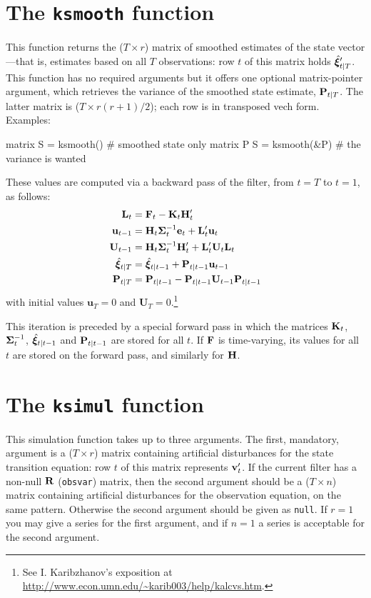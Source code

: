 \section{The \texttt{ksmooth} function}

This function returns the ($T \times r$) matrix of smoothed estimates
of the state vector---that is, estimates based on all $T$
observations: row $t$ of this matrix holds $\hat{\bm{\xi}}_{t|T}'$.  This
function has no required arguments but it offers one optional
matrix-pointer argument, which retrieves the variance of the smoothed
state estimate, $\mathbf{P}_{t|T}$.  The latter matrix is ($T \times
r(r+1)/2$); each row is in transposed vech form.  Examples:
%
\begin{code}
matrix S = ksmooth()  # smoothed state only
matrix P
S = ksmooth(&P)       # the variance is wanted
\end{code}

These values are computed via a backward pass of the filter, from
$t = T$ to $t = 1$, as follows:
%
\begin{align*}
\mathbf{L}_t &= \mathbf{F}_t - \mathbf{K}_t \mathbf{H}_t' \\
\mathbf{u}_{t-1} &= \mathbf{H}_t \bm{\Sigma}_t^{-1} \mathbf{e}_t 
 + \mathbf{L}_t' \mathbf{u}_t \\
\mathbf{U}_{t-1} &= \mathbf{H}_t \bm{\Sigma}_t^{-1} \mathbf{H}_t' + 
  \mathbf{L}_t' \mathbf{U}_t \mathbf{L}_t \\
\hat{\bm{\xi}}_{t|T} &= \hat{\bm{\xi}}_{t|t-1} + 
  \mathbf{P}_{t|t-1} \mathbf{u}_{t-1} \\
\mathbf{P}_{t|T} &= \mathbf{P}_{t|t-1} - 
  \mathbf{P}_{t|t-1} \mathbf{U}_{t-1} \mathbf{P}_{t|t-1}
\end{align*}
%
with initial values $\mathbf{u}_T = 0$ and $\mathbf{U}_T =
0$.\footnote{See I. Karibzhanov's exposition at
\url{http://www.econ.umn.edu/~karib003/help/kalcvs.htm}.}

This iteration is preceded by a special forward pass in which the
matrices $\mathbf{K}_t$, $\bm{\Sigma}_t^{-1}$, $\hat{\bm{\xi}}_{t|t-1}$ and
$\mathbf{P}_{t|t-1}$ are stored for all $t$.  If $\mathbf{F}$
is time-varying, its values for all $t$ are stored on the forward
pass, and similarly for $\mathbf{H}$.


\section{The \texttt{ksimul} function}

This simulation function takes up to three arguments.  The first,
mandatory, argument is a ($T \times r$) matrix containing artificial
disturbances for the state transition equation: row $t$ of this matrix
represents $\mathbf{v}_t'$.  If the current filter has a non-null
$\mathbf{R}$ (\texttt{obsvar}) matrix, then the second argument should be
a ($T \times n$) matrix containing artificial disturbances for the
observation equation, on the same pattern.  Otherwise the second
argument should be given as \texttt{null}.  If $r=1$ you may give a
series for the first argument, and if $n=1$ a series is acceptable for
the second argument.


